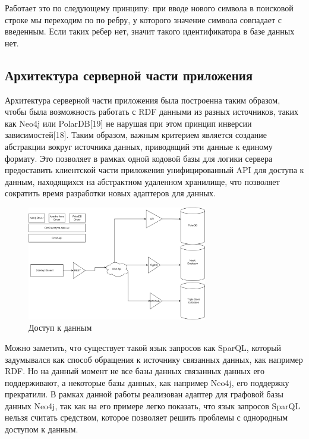 \documentclass[12pt]{article}
\begin{document}
Работает это по следующему принципу: при вводе нового символа в поисковой строке мы переходим по по ребру, у которого значение символа совпадает с введенным. Если таких ребер нет, значит такого идентификатора в базе данных нет.

\pagebreak

\subsection{Архитектура серверной части приложения}
\qquad Архитектура серверной части приложения была построенна таким образом, чтобы была возможность работать с RDF данными из разных источников, таких как Neo4j или PolarDB[19] не нарушая при этом принцип инверсии зависимостей[18]. Таким образом, важным критерием является создание абстракции вокруг источника данных, приводящий эти данные к единому формату. Это позволяет в рамках одной кодовой базы для логики сервера предоставить клиентской части приложения унифицированный API для доступа к данным, находящихся на  абстрактном удаленном хранилище, что позволяет сократить время разработки новых адаптеров для данных.

\begin{figure}[!ht]
    \centering
    \includegraphics[width=0.7\textwidth]{_images/data_access.png}
    \caption{Доступ к данным}
    \label{fig:data_access}
\end{figure}

Можно заметить, что существует такой язык запросов как SparQL, который задумывался как способ обращения к источнику связанных данных, как например RDF. Но на данный момент не все базы данных связанных данных его поддерживают, а некоторые базы данных, как например Neo4j, его поддержку прекратили. В рамках данной работы реализован адаптер для графовой базы данных Neo4j, так как на его примере легко показать, что язык запросов SparQL нельзя считать средством, которое позволяет решить проблемы с однородным доступом к данным.
\end{document}
